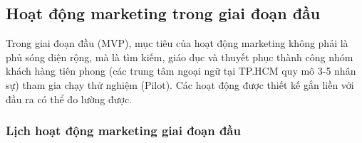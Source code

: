 %







\subsection{Hoạt động marketing trong giai đoạn đầu}

Trong giai đoạn đầu (MVP), mục tiêu của hoạt động marketing không phải là phủ sóng diện rộng, mà là tìm kiếm, giáo dục và thuyết phục thành công nhóm khách hàng tiên phong (các trung tâm ngoại ngữ tại TP.HCM quy mô 3-5 nhân sự) tham gia chạy thử nghiệm (Pilot). Các hoạt động được thiết kế gắn liền với đầu ra có thể đo lường được.

\subsubsection{Lịch hoạt động marketing giai đoạn đầu}

